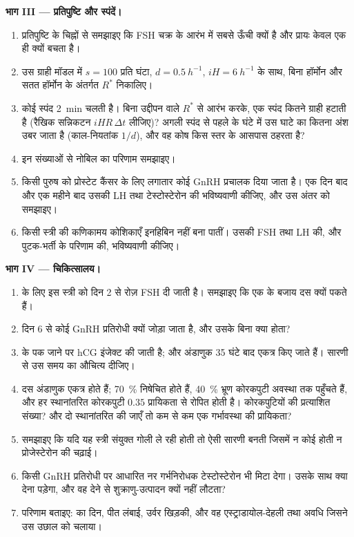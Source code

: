 \begin{problem}
\medskip
\noindent\textbf{भाग III --- प्रतिपुष्टि और स्पंदें।}
\begin{enumerate}[resume]
  \item प्रतिपुष्टि के चिह्नों से समझाइए कि FSH चक्र के आरंभ में सबसे
        ऊँची क्यों है और प्रायः केवल एक ही  क्यों
        बचता है।
  \item उस ग्राही मॉडल में $s = 100$ प्रति घंटा, $d =
        \qty{0.5}{h^{-1}}$, $iH = \qty{6}{h^{-1}}$ के साथ, बिना
        हॉर्मोन और सतत हॉर्मोन के अंतर्गत $R^*$ निकालिए।
  \item कोई स्पंद \qty{2}{min} चलती है। बिना उद्दीपन वाले
        $R^*$ से आरंभ करके, एक स्पंद कितने ग्राही हटाती है (रैखिक
        सन्निकटन $iHR\,\Delta t$ लीजिए)? अगली स्पंद से पहले के घंटे में
        उस घाटे का कितना अंश उबर जाता है (काल-नियतांक $1/d$), और वह
        कोष किस स्तर के आसपास ठहरता है?
  \item इन संख्याओं से नोबिल का परिणाम समझाइए।
  \item किसी पुरुष को प्रोस्टेट कैंसर के लिए लगातार कोई GnRH प्रचालक
        दिया जाता है। एक दिन बाद और एक महीने बाद उसकी LH तथा
        टेस्टोस्टेरोन की भविष्यवाणी कीजिए, और उस अंतर को समझाइए।
  \item किसी स्त्री की कणिकामय कोशिकाएँ इनहिबिन नहीं बना पातीं। उसकी
        FSH तथा LH की, और पुटक-भर्ती के परिणाम की, भविष्यवाणी कीजिए।
\end{enumerate}

\medskip
\noindent\textbf{भाग IV --- चिकित्सालय।}
\begin{enumerate}[resume]
  \item {} के लिए इस स्त्री को दिन 2 से रोज़ FSH दी
        जाती है। समझाइए कि एक के बजाय दस  क्यों पकते हैं।
  \item दिन 6 से कोई GnRH प्रतिरोधी क्यों जोड़ा जाता है, और उसके बिना
        क्या होता?
  \item {} के पक जाने पर hCG इंजेक्ट की जाती है; और अंडाणुक
        35 घंटे बाद एकत्र किए जाते हैं। सारणी से उस समय का औचित्य दीजिए।
  \item दस अंडाणुक एकत्र होते हैं; \qty{70}{\%} निषेचित होते हैं,
        \qty{40}{\%} भ्रूण कोरकपुटी अवस्था तक पहुँचते हैं, और हर
        स्थानांतरित कोरकपुटी $0.35$ प्रायिकता से रोपित होती है।
        कोरकपुटियों की प्रत्याशित संख्या? और दो स्थानांतरित की जाएँ तो
        कम से कम एक गर्भावस्था की प्रायिकता?
  \item समझाइए कि यदि यह स्त्री संयुक्त गोली ले रही होती तो ऐसी सारणी
        बनती जिसमें न कोई  होती न प्रोजेस्टेरोन की
        चढ़ाई।
  \item किसी GnRH प्रतिरोधी पर आधारित नर गर्भनिरोधक टेस्टोस्टेरोन भी
        मिटा देगा। उसके साथ क्या देना पड़ेगा, और वह देने से
        शुक्राणु-उत्पादन क्यों नहीं लौटता?
  \item परिणाम बताइए:  का दिन, पीत लंबाई, उर्वर
        खिड़की, और वह एस्ट्राडायोल-देहली तथा अवधि जिसने उस उछाल को
        चलाया।
\end{enumerate}
\end{problem}
